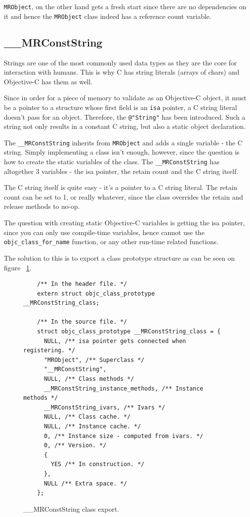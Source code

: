 \verb=MRObject=, on the other hand gets a fresh start since there are no dependencies on it and hence the \verb=MRObject= class indeed has a reference count variable.

\subsection{\_\_MRConstString}

Strings are one of the most commonly used data types as they are the core for interaction with humans. This is why C has string literals (arrays of chars) and Objective-C has them as well.

Since in order for a piece of memory to validate as an Objective-C object, it must be a pointer to a structure whose first field is an \verb=isa= pointer, a C string literal doesn't pass for an object. Therefore, the \verb=@"String"= has been introduced. Such a string not only results in a constant C string, but also a static object declaration.

The \verb=__MRConstString= inherits from \verb=MRObject= and adds a single variable - the C string. Simply implementing a class isn't enough, however, since the question is how to create the static variables of the class. The \verb=__MRConstString= has altogether 3 variables - the isa pointer, the retain count and the C string itself.

The C string itself is quite easy - it's a pointer to a C string literal. The retain count can be set to 1, or really whatever, since the class overrides the retain and release methods to no-op.

The question with creating static Objective-C variables is getting the isa pointer, since you can only use compile-time variables, hence cannot use the \verb=objc_class_for_name= function, or any other run-time related functions.

The solution to this is to export a class prototype structure as can be seen on figure ~\ref{fig:mr_const_str_export}.

\begin{figure}
  \begin{verbatim}
    /** In the header file. */
    extern struct objc_class_prototype __MRConstString_class;
    
    /** In the source file. */
    struct objc_class_prototype __MRConstString_class = {
      NULL, /** isa pointer gets connected when registering. */
      "MRObject", /** Superclass */
      "__MRConstString",
      NULL, /** Class methods */
      __MRConstString_instance_methods, /** Instance methods */
      __MRConstString_ivars, /** Ivars */
      NULL, /** Class cache. */
      NULL, /** Instance cache. */
      0, /** Instance size - computed from ivars. */
      0, /** Version. */
      {
        YES /** In construction. */
      },
      NULL /** Extra space. */
    };
  \end{verbatim}
  \centering{}
  \caption{\_\_MRConstString class export.}
  \label{fig:mr_const_str_export}
\end{figure}

